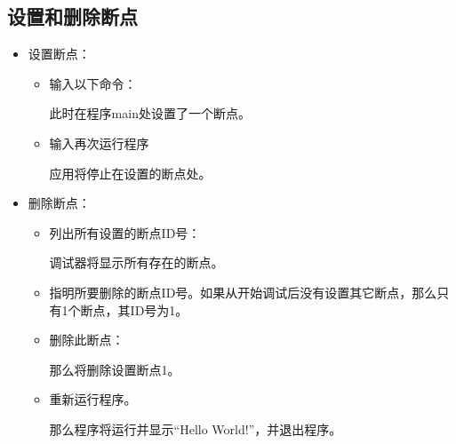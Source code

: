 \documentclass[a4paper,12pt,english]{sphinxmanual}
\begin{document}
\subsection{设置和删除断点}
\label{\detokenize{debug/debug:id15}}\begin{itemize}
\item {} 
\sphinxAtStartPar
设置断点：
\begin{itemize}
\item {} 
\sphinxAtStartPar
输入以下命令：

\sphinxAtStartPar
此时在程序main处设置了一个断点。

\item {} 
\sphinxAtStartPar
输入再次运行程序

\sphinxAtStartPar
应用将停止在设置的断点处。

\end{itemize}

\item {} 
\sphinxAtStartPar
删除断点：
\begin{itemize}
\item {} 
\sphinxAtStartPar
列出所有设置的断点ID号：

\sphinxAtStartPar
调试器将显示所有存在的断点。

\item {} 
\sphinxAtStartPar
指明所要删除的断点ID号。如果从开始调试后没有设置其它断点，那么只有1个断点，其ID号为1。

\item {} 
\sphinxAtStartPar
删除此断点：

\sphinxAtStartPar
那么将删除设置断点1。

\item {} 
\sphinxAtStartPar
重新运行程序。

\sphinxAtStartPar
那么程序将运行并显示“Hello World!”，并退出程序。

\end{itemize}

\end{itemize}
\end{document}
